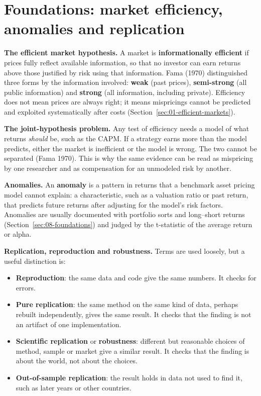 \section{Foundations: market efficiency, anomalies and replication}
\label{sec:10-foundations}

\textbf{The efficient market hypothesis.} A market is \textbf{informationally efficient} if prices fully reflect available information, so that no investor can earn returns above those justified by risk using that information. Fama (1970) distinguished three forms by the information involved: \textbf{weak} (past prices), \textbf{semi-strong} (all public information) and \textbf{strong} (all information, including private). Efficiency does not mean prices are always right; it means mispricings cannot be predicted and exploited systematically after costs (Section~\ref{sec:01-efficient-markets}).

\textbf{The joint-hypothesis problem.} Any test of efficiency needs a model of what returns \emph{should} be, such as the CAPM. If a strategy earns more than the model predicts, either the market is inefficient or the model is wrong. The two cannot be separated (Fama 1970). This is why the same evidence can be read as mispricing by one researcher and as compensation for an unmodeled risk by another.

\textbf{Anomalies.} An \textbf{anomaly} is a pattern in returns that a benchmark asset pricing model cannot explain: a characteristic, such as a valuation ratio or past return, that predicts future returns after adjusting for the model's risk factors. Anomalies are usually documented with portfolio sorts and long--short returns (Section~\ref{sec:08-foundations}) and judged by the t-statistic of the average return or alpha.

\textbf{Replication, reproduction and robustness.} Terms are used loosely, but a useful distinction is:

\begin{itemize}
  \item \textbf{Reproduction}: the same data and code give the same numbers. It checks for errors.
  \item \textbf{Pure replication}: the same method on the same kind of data, perhaps rebuilt independently, gives the same result. It checks that the finding is not an artifact of one implementation.
  \item \textbf{Scientific replication} or \textbf{robustness}: different but reasonable choices of method, sample or market give a similar result. It checks that the finding is about the world, not about the choices.
  \item \textbf{Out-of-sample replication}: the result holds in data not used to find it, such as later years or other countries.
\end{itemize}

